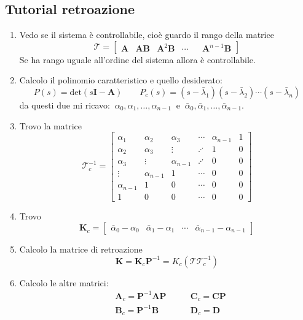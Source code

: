 \documentclass[a4paper]{article}
\renewcommand{\vec}{\bm}
\theoremstyle{definition}
\begin{document}
		\subsection{Tutorial retroazione}
			\begin{enumerate}
				\item Vedo se il sistema è controllabile, cioè guardo il rango della matrice
				\[
					\mathcal{T} = 
					\begin{bmatrix}
						\vec{A} & \vec{A}\vec{B} & \vec{A}^2\vec{B} & \cdots & & \vec{A}^{n-1}\vec{B}
					\end{bmatrix}
				\]
				Se ha rango uguale all'ordine del sistema allora è controllabile.
				\item Calcolo il polinomio caratteristico e quello desiderato:
				\[
					P(s) = \text{det}(s\vec{I} - \vec{A}) \qquad P_c(s) = (s - \bar{\lambda}_1)(s - \bar{\lambda}_2)\cdots (s - \bar{\lambda}_n)
				\]
				da questi due mi ricavo: $ \ \alpha_0, \alpha_1, \dots, \alpha_{n-1}\ $ e $ \ \bar{\alpha}_0, \bar{\alpha}_1, \dots, \bar{\alpha}_{n-1} $.
				\item Trovo la matrice 
				\[
					\mathcal{T}_c^{-1} =
					\begin{bmatrix}
						\alpha_1 & \alpha_2 & \alpha_3 & \cdots & \alpha_{n-1} & 1 \\
						\alpha_2 & \alpha_3 & \vdots & \iddots & 1 & 0 \\
						\alpha_3 & \vdots & \alpha_{n-1} & \iddots & 0 & 0 \\
						\vdots & \alpha_{n-1} & 1 & \cdots & 0 & 0 \\
						\alpha_{n-1} & 1 & 0 & \cdots & 0 & 0 \\
						1 & 0 & 0 & \cdots & 0 & 0
					\end{bmatrix}
				\]
				\item Trovo
				\[
					\vec{K}_c = 
					\begin{bmatrix}
						\bar{\alpha}_0 - \alpha_0 & \bar{\alpha}_1 - \alpha_1 & \cdots & \bar{\alpha}_{n-1} - \alpha_{n-1}
					\end{bmatrix}
				\]
				\item Calcolo la matrice di retroazione
				\[
					\vec{K} =\vec{K}_c \vec{P}^{-1} = K_c (\mathcal{T}\mathcal{T}_c^{-1})
				\] 
				\item Calcolo le altre matrici:
				\begin{align*}
					& \vec{A}_c = \vec{P}^{-1} \vec{A} \vec{P} \qquad & \vec{C}_c = \vec{C}\vec{P} \\
					& \vec{B}_c = \vec{P}^{-1} \vec{B} \qquad & \vec{D}_c = \vec{D}
				\end{align*}
			\end{enumerate}
			
\end{document}
